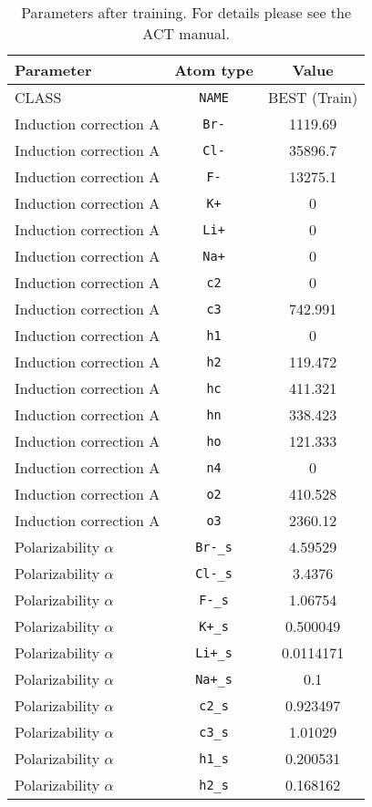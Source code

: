 \begin{table}[ht]
\caption{Parameters after training. For details please see the ACT manual.}
\begin{tabular}{lcc}
\hline
Parameter & Atom type & Value \\ 
\hline
CLASS & \verb^NAME^ & BEST (Train) \\ 
Induction correction A & \verb^Br-^ & 1119.69 \\ 
Induction correction A & \verb^Cl-^ & 35896.7 \\ 
Induction correction A & \verb^F-^ & 13275.1 \\ 
Induction correction A & \verb^K+^ & 0 \\ 
Induction correction A & \verb^Li+^ & 0 \\ 
Induction correction A & \verb^Na+^ & 0 \\ 
Induction correction A & \verb^c2^ & 0 \\ 
Induction correction A & \verb^c3^ & 742.991 \\ 
Induction correction A & \verb^h1^ & 0 \\ 
Induction correction A & \verb^h2^ & 119.472 \\ 
Induction correction A & \verb^hc^ & 411.321 \\ 
Induction correction A & \verb^hn^ & 338.423 \\ 
Induction correction A & \verb^ho^ & 121.333 \\ 
Induction correction A & \verb^n4^ & 0 \\ 
Induction correction A & \verb^o2^ & 410.528 \\ 
Induction correction A & \verb^o3^ & 2360.12 \\ 
Polarizability $\alpha$ & \verb^Br-_s^ & 4.59529 \\ 
Polarizability $\alpha$ & \verb^Cl-_s^ & 3.4376 \\ 
Polarizability $\alpha$ & \verb^F-_s^ & 1.06754 \\ 
Polarizability $\alpha$ & \verb^K+_s^ & 0.500049 \\ 
Polarizability $\alpha$ & \verb^Li+_s^ & 0.0114171 \\ 
Polarizability $\alpha$ & \verb^Na+_s^ & 0.1 \\ 
Polarizability $\alpha$ & \verb^c2_s^ & 0.923497 \\ 
Polarizability $\alpha$ & \verb^c3_s^ & 1.01029 \\ 
Polarizability $\alpha$ & \verb^h1_s^ & 0.200531 \\ 
Polarizability $\alpha$ & \verb^h2_s^ & 0.168162 \\ 

\end{tabular}
\end{table}
